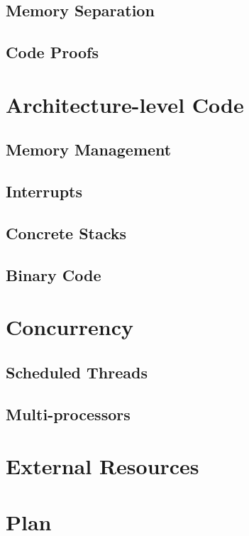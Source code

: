 \documentclass{report}
\begin{document}
\section{Memory Separation}
\section{Code Proofs}

\chapter{Architecture-level Code}
\section{Memory Management}
\section{Interrupts}
\section{Concrete Stacks}
\section{Binary Code}

\chapter{Concurrency}
\section{Scheduled Threads}
\section{Multi-processors}


\chapter{External Resources}

\chapter{Plan}
\end{document}
